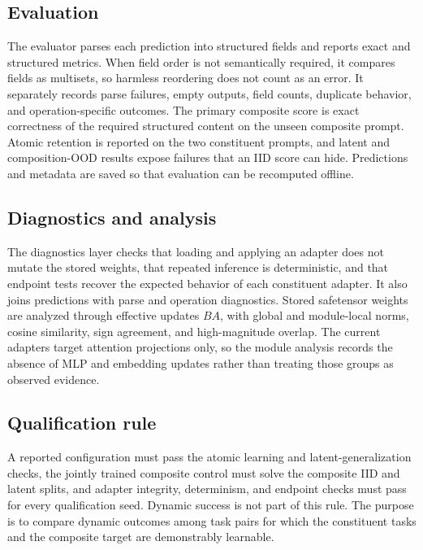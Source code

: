 \documentclass[10pt,twocolumn]{article}
\begin{document}
\subsection{Evaluation}

The evaluator parses each prediction into structured fields and reports exact and structured metrics. When field order is not semantically required, it compares fields as multisets, so harmless reordering does not count as an error. It separately records parse failures, empty outputs, field counts, duplicate behavior, and operation-specific outcomes. The primary composite score is exact correctness of the required structured content on the unseen composite prompt. Atomic retention is reported on the two constituent prompts, and latent and composition-OOD results expose failures that an IID score can hide. Predictions and metadata are saved so that evaluation can be recomputed offline.

\subsection{Diagnostics and analysis}

The diagnostics layer checks that loading and applying an adapter does not mutate the stored weights, that repeated inference is deterministic, and that endpoint tests recover the expected behavior of each constituent adapter. It also joins predictions with parse and operation diagnostics. Stored safetensor weights are analyzed through effective updates $B A$, with global and module-local norms, cosine similarity, sign agreement, and high-magnitude overlap. The current adapters target attention projections only, so the module analysis records the absence of MLP and embedding updates rather than treating those groups as observed evidence.

\subsection{Qualification rule}

A reported configuration must pass the atomic learning and latent-generalization checks, the jointly trained composite control must solve the composite IID and latent splits, and adapter integrity, determinism, and endpoint checks must pass for every qualification seed. Dynamic success is not part of this rule. The purpose is to compare dynamic outcomes among task pairs for which the constituent tasks and the composite target are demonstrably learnable.
\end{document}
